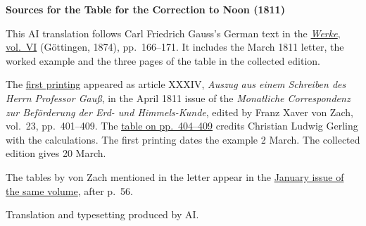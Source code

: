 \clearpage\thispagestyle{empty}
\begin{center}{\textbf{Sources for the Table for the Correction to Noon (1811)}}\end{center}
\noindent This AI translation follows Carl Friedrich Gauss's German text in the \href{https://gdz.sub.uni-goettingen.de/id/PPN236007467}{\textit{Werke}, vol.~VI} (Göttingen, 1874), pp.~166--171. It includes the March 1811 letter, the worked example and the three pages of the table in the collected edition.
\par\smallskip\noindent The \href{https://www.digitale-sammlungen.de/en/view/bsb10538612?page=411}{first printing} appeared as article XXXIV, \textit{Auszug aus einem Schreiben des Herrn Professor Gauß}, in the April 1811 issue of the \textit{Monatliche Correspondenz zur Beförderung der Erd- und Himmels-Kunde}, edited by Franz Xaver von Zach, vol.~23, pp.~401--409. The \href{https://www.digitale-sammlungen.de/en/view/bsb10538612?page=414}{table on pp.~404--409} credits Christian Ludwig Gerling with the calculations. The first printing dates the example 2 March. The collected edition gives 20 March.
\par\smallskip\noindent The tables by von Zach mentioned in the letter appear in the \href{https://www.digitale-sammlungen.de/en/view/bsb10538612?page=65}{January issue of the same volume}, after p.~56.
\par\smallskip\noindent Translation and typesetting produced by AI.
\clearpage
